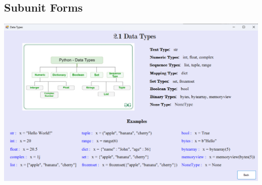 \documentclass[12pt]{article}
\newcommand{\en}[1]{\foreignlanguage{English}{#1}}
\begin{document}
\subsection*{\en{Subunit Forms}}
\begin{center}
    
    \includegraphics[width=1\linewidth]{subunit.png}
\end{center}
\end{document}
